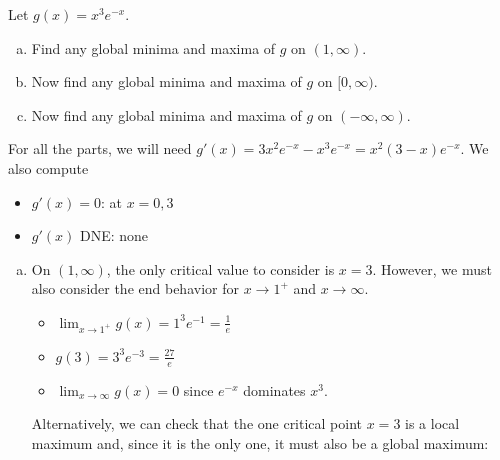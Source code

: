 \documentclass[11pt]{exam}
\begin{document}
\begin{questions}
\begin{solution}
\end{solution}
\question Let $g(x) = x^3e^{-x}$.
\begin{enumerate}[(a)]
\item Find any global minima and maxima of $g$ on $(1,\infty)$.
\vfill
\item Now find any global minima and maxima of $g$ on $[0,\infty)$.
\vfill
\item Now find any global minima and maxima of $g$ on $(-\infty,\infty)$.
\end{enumerate}
\begin{solution}
  For all the parts, we will need \(g'(x) = 3x^2 e^{-x} - x^3 e^{-x} =
  x^2(3-x)e^{-x}\). We also compute
  \begin{itemize}
  \item \(g'(x) = 0\): at \(x=0,3\)
  \item \(g'(x)\) DNE: none
  \end{itemize}
  \begin{enumerate}[(a)]
  \item On \((1,\infty)\), the only critical value to consider is
    \(x=3\). However, we must also consider the end behavior for \(x
    \to 1^+\) and \(x \to \infty\).
    \begin{itemize}
    \item \(\lim_{x \to 1^+} g(x) = 1^3 e^{-1} = \frac{1}{e}\)
    \item \(g(3) = 3^3 e^{-3} = \frac{27}{e}\)
    \item \(\lim_{x \to \infty} g(x) = 0\) since \(e^{-x}\) dominates
      \(x^3\). 
    \end{itemize}
    Alternatively, we can check that the one critical point \(x=3\) is
    a local maximum and, since it is the only one, it must also be a
    global maximum: \\



\end{enumerate}
\end{solution}
\end{questions}
\end{document}
